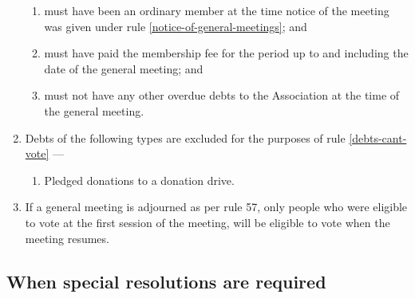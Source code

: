 \documentclass[../constitution.tex]{subfiles}
\begin{document}
\begin{enumerate}
  \begin{enumerate}
  \item must have been an ordinary member at the time notice of the meeting was given under rule \ref{notice-of-general-meetings}; and
  \item must have paid the membership fee for the period up to and including the date of the general meeting; and
  \item must not have any other overdue debts to the Association at the time of the general meeting. \label{debts-cant-vote}
  \end{enumerate}

\item Debts of the following types are excluded for the purposes of rule \ref{debts-cant-vote} ---
  \begin{enumerate}
  \item Pledged donations to a donation drive.
  \end{enumerate}

\item If a general meeting is adjourned as per rule 57, only people who were eligible to vote at the first session of the meeting, will be eligible to vote when the meeting resumes.

\end{enumerate}

\hypertarget{when-special-resolutions-are-required}{%
\subsection{When special resolutions are required}\label{when-special-resolutions-are-required}}
\end{document}
